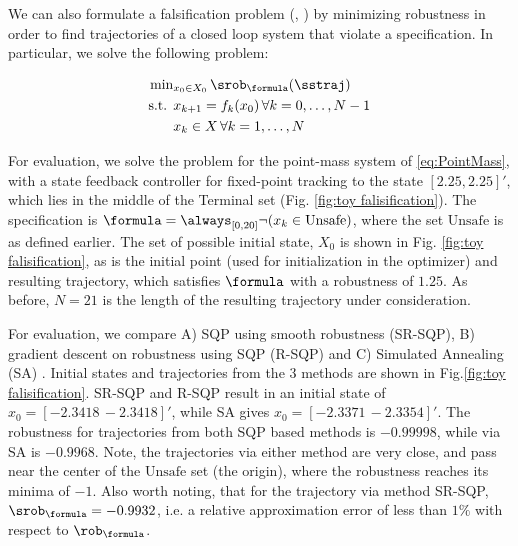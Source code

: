We can also formulate a falsification problem (\cite{AbbasATVA11_LinFalsification}, \cite{Deshmukh15_IterativeApproaches}) by minimizing robustness in order to find trajectories of a closed loop system that violate a specification. In particular, we solve the following problem:

\begin{subequations}
\vspace{-10pt}
\label{eq:falsification}
\begin{align}
\text{min}&_{x_0 \in X_0 } \, \srob_{\formula}(\sstraj) \nonumber \\
\text{s.t. } & x_{k+1} = f_k(x_0) \, \forall k=0,\dotsc,N-1 \\
&  x_{k} \in X \, \forall k=1,\dotsc,N
\end{align}
\end{subequations}

For evaluation, we solve the problem for the point-mass system of \eqref{eq:PointMass}, with a state feedback controller for fixed-point tracking to the state $[2.25,2.25]'$, which lies in the middle of the Terminal set (Fig. \ref{fig:toy falisification}). The specification is $\formula=\always_{[0,20]} \neg (x_k \in \text{Unsafe})$, where the set $\text{Unsafe}$ is as defined earlier. The set of possible initial state, $X_0$ is shown in Fig. \ref{fig:toy falisification}, as is the initial point (used for initialization in the optimizer) and resulting trajectory, which satisfies $\formula$ with a robustness of $1.25$. As before, $N=21$ is the length of the resulting trajectory under consideration.

For evaluation, we compare A) SQP using smooth robustness (SR-SQP), B) gradient descent on robustness using SQP (R-SQP) and C) Simulated Annealing (SA) \cite{SA_book}. Initial states and trajectories from the 3 methods are shown in Fig.\ref{fig:toy falisification}. SR-SQP and R-SQP result in an initial state of $x_0=[-2.3418\, -2.3418]'$, while SA gives $x_0=[-2.3371\, -2.3354]'$. The robustness for trajectories from both SQP based methods is $-0.99998$, while via SA is $-0.9968$. Note, the trajectories via either method are very close, and pass near the center of the $\text{Unsafe}$ set (the origin), where the robustness reaches its minima of $-1$. Also worth noting, that for the trajectory via method SR-SQP, $\srob_{\formula}=-0.9932$, i.e. a relative approximation error of less than $1\%$ with respect to $\rob_{\formula}$.


